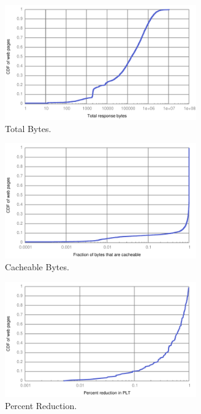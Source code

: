 
\begin{figure}[t]
    \includegraphics[width=3.25in]{../graphs/total_bytes/total_bytes.pdf}
    \caption[]{\label{fig:total_bytes} Total Bytes.}
\end{figure}

\begin{figure}[t]
    \includegraphics[width=3.25in]{../graphs/cacheable_bytes/cacheable_bytes.pdf}
    \caption[]{\label{fig:cacheable_bytes} Cacheable Bytes.}
\end{figure}

\begin{figure}[t]
    \includegraphics[width=3.25in]{../graphs/percent_plt_reduction/percent_reduction.pdf}
    \caption[]{\label{fig:percent_reduction} Percent Reduction.}
\end{figure}



